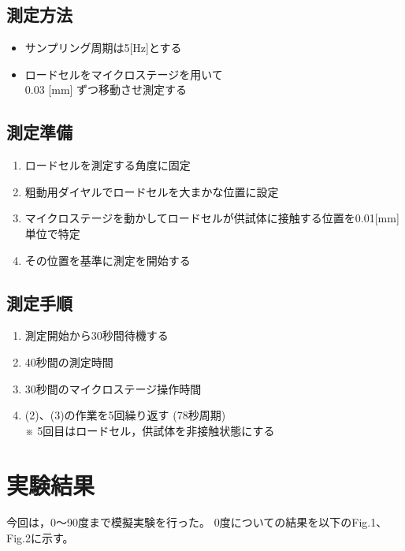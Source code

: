 \documentclass[twocolumn,a4j]{jsarticle}
\begin{document}
\subsection{測定方法}
\begin{itemize}
    \item サンプリング周期は5[Hz]とする
    \item ロードセルをマイクロステージを用いて\\0.03 [mm] ずつ移動させ測定する
\end{itemize}

\subsection{測定準備}
\begin{screen}
    \begin{enumerate}[(1)]
        \item ロードセルを測定する角度に固定
        \item 粗動用ダイヤルでロードセルを大まかな位置に設定
        \item マイクロステージを動かしてロードセルが供試体に接触する位置を0.01[mm]単位で特定
        \item その位置を基準に測定を開始する
    \end{enumerate}
\end{screen}

\subsection{測定手順}
\begin{screen}
    \begin{enumerate}[(1)]
        \item 測定開始から30秒間待機する
        \item 40秒間の測定時間
        \item 30秒間のマイクロステージ操作時間
        \item (2)、(3)の作業を5回繰り返す (78秒周期)\\
              ※ 5回目はロードセル，供試体を非接触状態にする
    \end{enumerate}
\end{screen}

\section{実験結果}
今回は，0～90度まで模擬実験を行った。
0度についての結果を以下のFig.1、Fig.2に示す。
\end{document}
